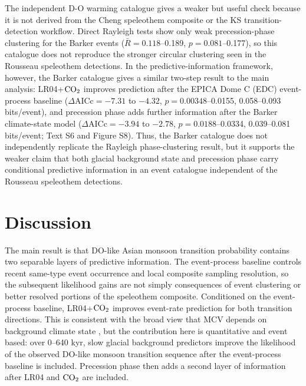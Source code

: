 \documentclass[11pt]{article}
\begin{document}
The independent \citet{barker2011800} D-O warming catalogue gives a weaker but useful check because it is not derived from the Cheng speleothem composite or the \citet{rousseau2023reliable} KS transition-detection workflow. Direct Rayleigh tests show only weak precession-phase clustering for the Barker events (\(\bar{R}=0.118\)--0.189, \(p=0.081\)--0.177), so this catalogue does not reproduce the stronger circular clustering seen in the Rousseau speleothem detections. In the predictive-information framework, however, the Barker catalogue gives a similar two-step result to the main analysis: LR04+\(\ce{CO2}\) improves prediction after the EPICA Dome C (EDC) event-process baseline (\(\Delta\mathrm{AICc}=-7.31\) to \(-4.32\), \(p=0.00348\)--0.0155, 0.058--0.093 bits/event), and precession phase adds further information after the Barker climate-state model (\(\Delta\mathrm{AICc}=-3.94\) to \(-2.78\), \(p=0.0188\)--0.0334, 0.039--0.081 bits/event; Text S6 and Figure S8). Thus, the Barker catalogue does not independently replicate the Rayleigh phase-clustering result, but it supports the weaker claim that both glacial background state and precession phase carry conditional predictive information in an event catalogue independent of the Rousseau speleothem detections.



\section*{Discussion}
The main result is that DO-like Asian monsoon transition probability contains two separable layers of predictive information. The event-process baseline controls recent same-type event occurrence and local composite sampling resolution, so the subsequent likelihood gains are not simply consequences of event clustering or better resolved portions of the speleothem composite. Conditioned on the event-process baseline, LR04+\(\ce{CO2}\) improves event-rate prediction for both transition directions. This is consistent with the broad view that MCV depends on background climate state \citep{barker2011800,zhang2017abrupt,vettoretti2022atmospheric,malmierca2023dansgaard}, but the contribution here is quantitative and event based: over 0--640 kyr, slow glacial background predictors improve the likelihood of the observed DO-like monsoon transition sequence after the event-process baseline is included. Precession phase then adds a second layer of information after LR04 and \(\ce{CO2}\) are included.
\end{document}
